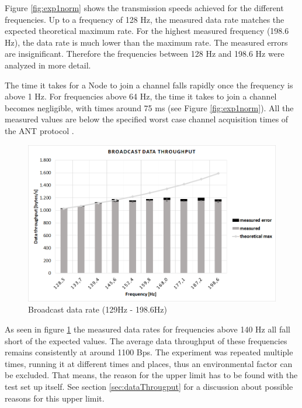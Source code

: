 \begin{description}
	Figure \ref{fig:exp1norm} shows the transmission speeds achieved for the different frequencies. Up to a frequency of 128 Hz, the measured data rate matches the expected theoretical maximum rate. For the highest measured frequency (198.6 Hz), the data rate is much lower than the maximum rate. The measured errors are insignificant. Therefore the frequencies between 128 Hz and 198.6 Hz were analyzed in more detail. 
		
	The time it takes for a Node to join a channel falls rapidly once the frequency is above 1 Hz. For frequencies above 64 Hz, the time it takes to join a channel becomes negligible, with times around 75 ms (see Figure \ref{fig:exp1norm}). All the measured values are below the specified worst case channel acquisition times of the ANT protocol \cite{AntChan}.
	
	\begin{figure}[H]
		\centering
		\includegraphics[scale=0.5]{content/images/exp1_detail.png}
		\caption{Broadcast data rate (129Hz - 198.6Hz)}\label{fig:exp1between}
	\end{figure}
	As seen in figure \ref{fig:exp1between} the measured data rates for frequencies above 140 Hz all fall short of the expected values. The average data throughput of these frequencies remains consistently at around 1100 Bps. The experiment was repeated multiple times, running it at different times and places, thus an environmental factor can be excluded. That means, the reason for the upper limit has to be found with the test set up itself. See section \ref{sec:dataThrougput} for a discussion about possible reasons for this upper limit.
	

\end{description}
